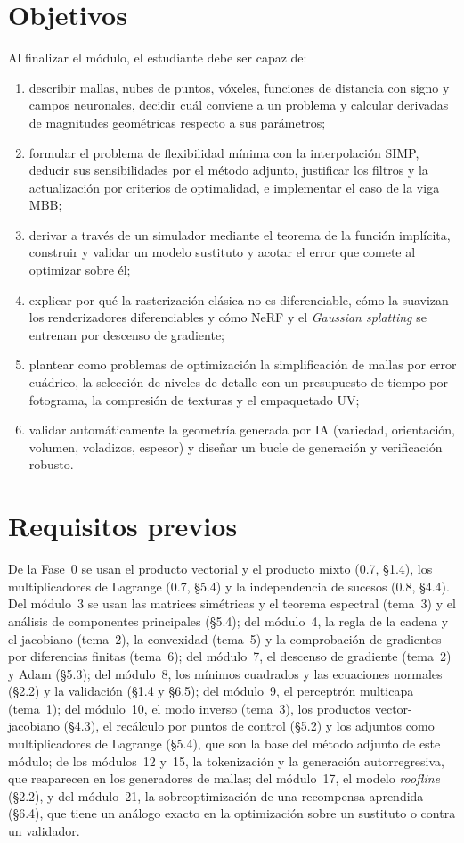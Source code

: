\documentclass[11pt,a4paper,twoside,openany]{book}
\begin{document}
\section*{Objetivos}
Al finalizar el módulo, el estudiante debe ser capaz de:
\begin{enumerate}[label=\arabic*.]
  \item describir mallas, nubes de puntos, vóxeles, funciones de distancia con signo y campos neuronales, decidir cuál conviene a un problema y calcular derivadas de magnitudes geométricas respecto a sus parámetros;
  \item formular el problema de flexibilidad mínima con la interpolación SIMP, deducir sus sensibilidades por el método adjunto, justificar los filtros y la actualización por criterios de optimalidad, e implementar el caso de la viga MBB;
  \item derivar a través de un simulador mediante el teorema de la función implícita, construir y validar un modelo sustituto y acotar el error que comete al optimizar sobre él;
  \item explicar por qué la rasterización clásica no es diferenciable, cómo la suavizan los renderizadores diferenciables y cómo NeRF y el \emph{Gaussian splatting} se entrenan por descenso de gradiente;
  \item plantear como problemas de optimización la simplificación de mallas por error cuádrico, la selección de niveles de detalle con un presupuesto de tiempo por fotograma, la compresión de texturas y el empaquetado UV;
  \item validar automáticamente la geometría generada por IA (variedad, orientación, volumen, voladizos, espesor) y diseñar un bucle de generación y verificación robusto.
\end{enumerate}

\section*{Requisitos previos}
De la Fase~0 se usan el producto vectorial y el producto mixto (0.7, §1.4), los multiplicadores de Lagrange (0.7, §5.4) y la independencia de sucesos (0.8, §4.4). Del módulo~3 se usan las matrices simétricas y el teorema espectral (tema~3) y el análisis de componentes principales (§5.4); del módulo~4, la regla de la cadena y el jacobiano (tema~2), la convexidad (tema~5) y la comprobación de gradientes por diferencias finitas (tema~6); del módulo~7, el descenso de gradiente (tema~2) y Adam (§5.3); del módulo~8, los mínimos cuadrados y las ecuaciones normales (§2.2) y la validación (§1.4 y §6.5); del módulo~9, el perceptrón multicapa (tema~1); del módulo~10, el modo inverso (tema~3), los productos vector-jacobiano (§4.3), el recálculo por puntos de control (§5.2) y los adjuntos como multiplicadores de Lagrange (§5.4), que son la base del método adjunto de este módulo; de los módulos~12 y~15, la tokenización y la generación autorregresiva, que reaparecen en los generadores de mallas; del módulo~17, el modelo \emph{roofline} (§2.2), y del módulo~21, la sobreoptimización de una recompensa aprendida (§6.4), que tiene un análogo exacto en la optimización sobre un sustituto o contra un validador.
\end{document}
